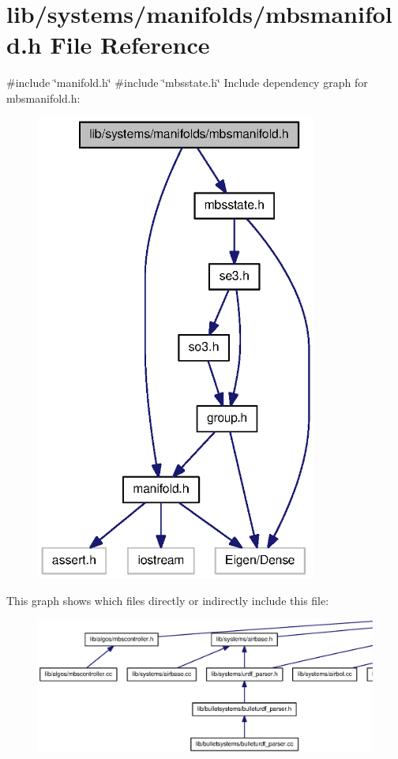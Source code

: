 \section{lib/systems/manifolds/mbsmanifold.h \-File \-Reference}
\label{mbsmanifold_8h}
{\ttfamily \#include \char`\"{}manifold.\-h\char`\"{}}\*
{\ttfamily \#include \char`\"{}mbsstate.\-h\char`\"{}}\*
\-Include dependency graph for mbsmanifold.\-h\-:\nopagebreak
\begin{figure}[H]
\begin{center}
\leavevmode
\includegraphics[width=262pt]{mbsmanifold_8h__incl}
\end{center}
\end{figure}
\-This graph shows which files directly or indirectly include this file\-:
\nopagebreak
\begin{figure}[H]
\begin{center}
\leavevmode
\includegraphics[width=350pt]{mbsmanifold_8h__dep__incl}
\end{center}
\end{figure}
